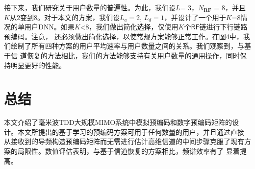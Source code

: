 \documentclass[10pt,journal,final]{IEEEtran}%
\begin{document}
接下来，我们研究关于用户数量的普遍性。为此，我们设$L$= 3，$N_{\mathbf{RF}}$ = 8，并且$K$从2变到8。对于本文的方案，我们设$L_{a} = 2$,
$L_{d} = 1$，并设计了一个用于$K$=8情况的单用户DNN。如果$K$<8，我们做出简化选择，仅使用$K$个$\mathsf{RF}$链进行下行链路预编码。注意，
还必须做出简化选择，以使常规方案能够正常工作。在图4中，我们绘制了所有四种方案的用户平均速率与用户数量之间的关系。我们观察到，与基于信
道恢复的方法相比，我们的方法能够支持有关用户数量的通用操作，同时保持明显更好的性能。
\vspace{-0.4em}
\section{总结}
\vspace{0.7em}
本文介绍了毫米波TDD大规模MIMO系统中模拟预编码和数字预编码矩阵的设计。本文所提出的基于学习的预编码方案可用于任何数量的用户，并且通过直接
从接收到的导频构造预编码矩阵而无需进行估计高维信道的中间步骤克服了现有方案的局限性。数值评估表明，与基于信道恢复的方案相比，频谱效率有了
显着提高。

\cite{ref1,ref2,ref3,ref4,ref5,ref6,ref7,ref8,ref9,ref10,ref11,ref12,ref13,ref14,ref15,ref16,ref17,ref18}

\end{document}
